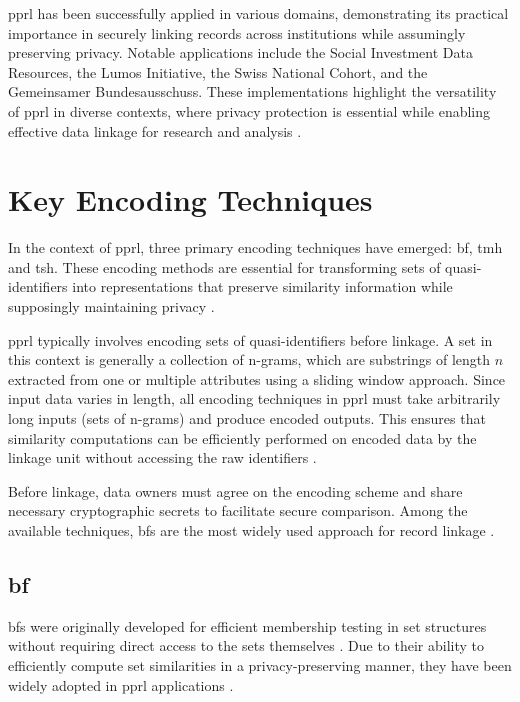 \ac{pprl} has been successfully applied in various domains, demonstrating its practical importance in securely linking records across institutions while assumingly preserving privacy.
Notable applications include the Social Investment Data Resources, the Lumos Initiative, the Swiss National Cohort, and the Gemeinsamer Bundesausschuss.
These implementations highlight the versatility of \ac{pprl} in diverse contexts, where privacy protection is essential while enabling effective data linkage for research and analysis \cite{schaefer2024}.



\section{Key Encoding Techniques} \label{sec:key-encodings}

In the context of \ac{pprl}, three primary encoding techniques have emerged: \ac{bf}, \ac{tmh} and \ac{tsh}.
These encoding methods are essential for transforming sets of quasi-identifiers into representations that preserve similarity information while supposingly maintaining privacy \cite{schaefer2024,vidanage2020graph, schnell2009privacy}.

\ac{pprl} typically involves encoding sets of quasi-identifiers before linkage.
A set in this context is generally a collection of n-grams, which are substrings of length $n$ extracted from one or multiple attributes using a sliding window approach.
Since input data varies in length, all encoding techniques in \ac{pprl} must take arbitrarily long inputs (sets of n-grams) and produce encoded outputs.
This ensures that similarity computations can be efficiently performed on encoded data by the linkage unit without accessing the raw identifiers \cite{vidanage2020graph,schaefer2024}.

Before linkage, data owners must agree on the encoding scheme and share necessary cryptographic secrets to facilitate secure comparison.
Among the available techniques, \ac{bf}s are the most widely used approach for record linkage \cite{schaefer2024}.

\subsection{\ac{bf}} \label{sec:bf}

\ac{bf}s were originally developed for efficient membership testing in set structures without requiring direct access to the sets themselves \cite{bloom1970space}.
Due to their ability to efficiently compute set similarities in a privacy-preserving manner, they have been widely adopted in \ac{pprl} applications \cite{schaefer2024,vidanage2020graph,schnell2009privacy}.

